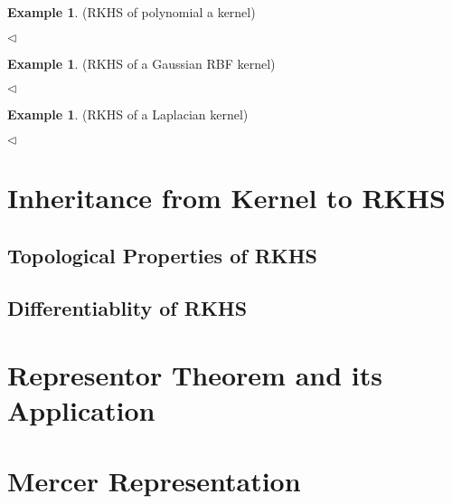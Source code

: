 \documentclass[a4paper,12pt]{article}
\theoremstyle{remark}
\theoremstyle{definition}
\theoremstyle{definition}
\newtheorem{ex}[thm]{Example}
\theoremstyle{definition}
\newcommand{\fin}{\hfill \( \triangleleft \) }
\begin{document}
\begin{ex} (RKHS of polynomial a kernel)

	\fin\end{ex}

\begin{ex} (RKHS of a Gaussian RBF kernel)

	\fin\end{ex}

\begin{ex} (RKHS of a Laplacian kernel)

	\fin\end{ex}

\section{Inheritance from Kernel to RKHS}
\subsection{Topological Properties of RKHS}
\subsection{Differentiablity of RKHS}

\section{Representor Theorem and its Application}

\section{Mercer Representation}


\end{document}
